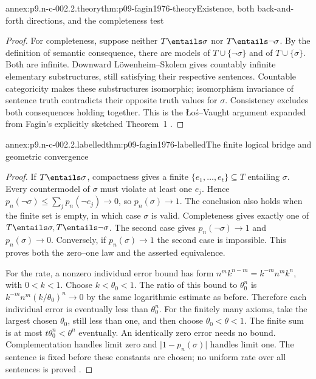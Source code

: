 \begin{annexitem}{annex:p9.n-c-002.2.theory}{thm:p09-fagin1976-theory}{Existence, both back-and-forth directions, and the completeness test}
\begin{proof}
For completeness, suppose neither \(T\entails\sigma\) nor
\(T\entails\neg\sigma\).  By the definition of semantic consequence,
there are models of \(T\cup\{\neg\sigma\}\) and of
\(T\cup\{\sigma\}\).  Both are infinite.  Downward
L\"owenheim--Skolem gives countably infinite elementary substructures,
still satisfying their respective sentences.  Countable categoricity
makes these substructures isomorphic; isomorphism invariance of sentence
truth contradicts their opposite truth values for \(\sigma\).
Consistency excludes both consequences holding together.  This is the
\L o\'s--Vaught argument expanded from Fagin's explicitly sketched
Theorem~1 \cite[p.~51]{Fagin1976}.
\end{proof}
\end{annexitem}

\begin{annexitem}{annex:p9.n-c-002.2.labelled}{thm:p09-fagin1976-labelled}{The finite logical bridge and geometric convergence}
\begin{proof}
If \(T\entails\sigma\), compactness gives a finite
\(\{e_1,\ldots,e_t\}\subseteq T\) entailing \(\sigma\).
Every countermodel of \(\sigma\) must violate at least one \(e_j\).
Hence \(p_n(\neg\sigma)\leq\sum_jp_n(\neg e_j)\to0\), so
\(p_n(\sigma)\to1\).  The conclusion also holds when the finite
set is empty, in which case \(\sigma\) is valid.  Completeness
gives exactly one of \(T\entails\sigma,T\entails\neg\sigma\).
The second case gives \(p_n(\neg\sigma)\to1\) and
\(p_n(\sigma)\to0\).  Conversely, if \(p_n(\sigma)\to1\)
the second case is impossible.  This proves both the zero--one law
and the asserted equivalence.

For the rate, a nonzero individual error bound has form
\(n^m k^{n-m}=k^{-m}n^m k^n\), with \(0<k<1\).
Choose \(k<\theta_0<1\).  The ratio of this bound to
\(\theta_0^n\) is \(k^{-m}n^m(k/\theta_0)^n\to0\)
by the same logarithmic estimate as before.  Therefore each individual
error is eventually less than \(\theta_0^n\).  For the finitely
many axioms, take the largest chosen \(\theta_0\), still less than
one, and then choose \(\theta_0<\theta<1\).  The finite sum is
at most \(t\theta_0^n<\theta^n\) eventually.  An identically
zero error needs no bound.  Complementation handles limit zero and
\(\lvert1-p_n(\sigma)\rvert\) handles limit one.  The sentence
is fixed before these constants are chosen; no uniform rate over all
sentences is proved \cite[cor.~3, thm.~4, and thm.~10]{Fagin1976}.
\end{proof}
\end{annexitem}

